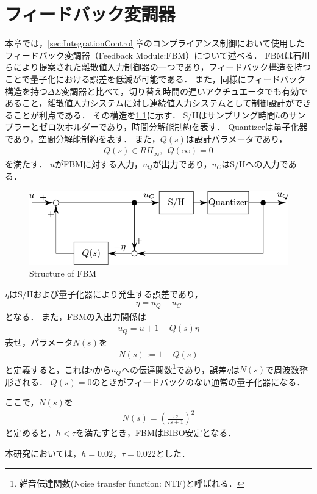 \chapter{フィードバック変調器}
\label{sec:FBM}
本章では，\ref{sec:IntegrationControl}章のコンプライアンス制御において使用したフィードバック変調器（Feedback Module:FBM）について述べる．
FBMは石川らにより提案された離散値入力制御器の一つであり，フィードバック構造を持つことで量子化における誤差を低減が可能である\cite{石川将人2007,石川将人2008フィードバック変調器を用いた離散値入力制御におけるアクチュエータ非線形性の補償}．
また，同様にフィードバック構造を持つ$\Delta\Sigma$変調器と比べて，切り替え時間の遅いアクチュエータでも有効であること，離散値入力システムに対し連続値入力システムとして制御設計ができることが利点である．
その構造を\figname\ref{fig:FBM}に示す．
S/Hはサンプリング時間$h$のサンプラーとゼロ次ホルダーであり，時間分解能制約を表す．
Quantizerは量子化器であり，空間分解能制約を表す．
また，$Q(s)$は設計パラメータであり，
\begin{align}
    \label{eq:FBM_Qs}
    Q(s)\in RH_\infty,~~Q(\infty) = 0
\end{align}
を満たす．
$u$がFBMに対する入力，$u_Q$が出力であり，$u_C$はS/Hへの入力である．

\begin{figure}[t]
    \centering
        \includegraphics[keepaspectratio, scale=1.0]{contents/Appendix_FBM/figure/FBM.pdf}
        \caption{Structure of FBM}
        \label{fig:FBM}
\end{figure}

$\eta$はS/Hおよび量子化器により発生する誤差であり，
\begin{align}
    \label{eq:FBM_eta}
    \eta = u_Q-u_C
\end{align}
となる．
また，FBMの入出力関係は
\begin{align}
    \label{eq:FBM_IO}
    u_Q = u + {1-Q(s)}\eta
\end{align}
表せ，パラメータ$N(s)$を
\begin{align}
    \label{eq:FBM_Ns}
    N(s) := 1-Q(s)
\end{align}
と定義すると，これは$\eta$から$u_Q$への伝達関数\footnote{雑音伝達関数(Noise transfer function: NTF)と呼ばれる．}であり，誤差$\eta$は$N(s)$で周波数整形される．
$Q(s)=0$のときがフィードバックのない通常の量子化器になる．

ここで，$N(s)$を
\begin{align}
    \label{eq:FBM_Ns2}
    N(s) = \left(\frac{\tau s}{\tau s + 1} \right)^2
\end{align}
と定めると，$h<\tau$を満たすとき，FBMはBIBO安定となる．

本研究においては，$h=0.02$，$\tau=0.022$とした．